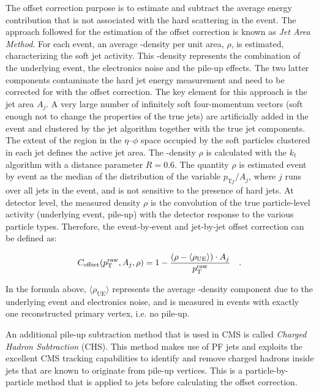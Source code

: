 The offset correction purpose is to estimate and subtract the average energy contribution that is not associated with the hard scattering in the event. The approach followed for the estimation of the offset correction is known as \emph{Jet Area Method}. For each event, an average \pt-density per unit area, $\rho$, is estimated, characterizing the soft jet activity. This \pt-density represents the combination of the underlying event, the electronics noise and the pile-up effects. 
The two latter components contaminate the hard jet energy measurement and need to be
corrected for with the offset correction. The key element for this approach is the jet area $A_j$.
A very large number of infinitely soft four-momentum vectors (soft enough not to change the properties of the true jets) are artificially added in the event and clustered by the jet algorithm together with the true jet components. The extent of the region in the $\eta$--$\phi$ space occupied by the soft particles clustered in each jet defines the active jet area. The \pt-density $\rho$ is calculated with the $k_t$ algorithm with a distance parameter $R=0.6$. The quantity $\rho$ is estimated event by event as the median of the distribution of the variable $p_{\mathrm{T}j}/A_j$, where $j$ runs over all jets in the event, and is not sensitive to the presence of hard jets. At detector level, the measured density $\rho$ is the convolution of the true particle-level activity (underlying event, pile-up) with the detector response to the various particle types. Therefore, the event-by-event and jet-by-jet offset correction can be defined as:

\begin{equation}
C_\mathrm{offset}(p_\mathrm{T}^\mathrm{raw},A_j,\rho) = 1 - \frac{\left( \rho - \langle\rho_\mathrm{UE}\rangle \right)\cdot A_j}{p_\mathrm{T}^\mathrm{raw}}\quad .
\end{equation}

\noindent In the formula above, $\langle\rho_\mathrm{UE}\rangle$ represents the average \pt-density component due to the underlying event and electronics noise, and is measured in events with exactly one reconstructed primary vertex, i.e. no pile-up.

An additional pile-up subtraction method that is used in CMS is called \emph{Charged Hadron Subtraction} (CHS). This method makes use of PF jets and exploits the excellent CMS tracking capabilities to identify and remove charged hadrons inside jets that are known to originate from pile-up vertices. This is a particle-by-particle method that is applied to jets before calculating the offset correction.

